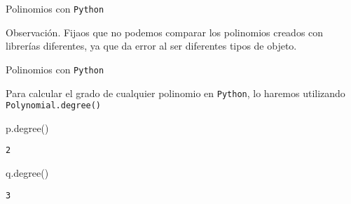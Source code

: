 \documentclass[
  ignorenonframetext,
]{beamer}
\newenvironment{Shaded}{\begin{snugshade}}{\end{snugshade}}
\newcommand{\NormalTok}[1]{#1}
\begin{document}
\begin{frame}{Polinomios con \texttt{Python}}
\protect\hypertarget{polinomios-con-python-4}{}

Observación. Fijaos que no podemos comparar los polinomios creados con
librerías diferentes, ya que da error al ser diferentes tipos de objeto.

\end{frame}

\begin{frame}[fragile]{Polinomios con \texttt{Python}}
\protect\hypertarget{polinomios-con-python-5}{}

Para calcular el grado de cualquier polinomio en \texttt{Python}, lo
haremos utilizando \texttt{Polynomial.degree()}

\begin{Shaded}
\begin{Highlighting}[]
\NormalTok{p.degree()}
\end{Highlighting}
\end{Shaded}

\begin{verbatim}
2
\end{verbatim}

\begin{Shaded}
\begin{Highlighting}[]
\NormalTok{q.degree()}
\end{Highlighting}
\end{Shaded}

\begin{verbatim}
3
\end{verbatim}

\end{frame}
\end{document}
